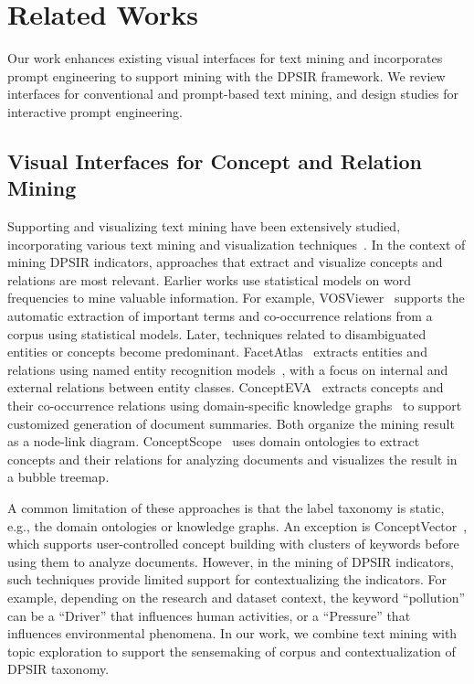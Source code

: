 \section{Related Works}
Our work enhances existing visual interfaces for text mining and incorporates prompt engineering to support mining with the DPSIR framework.
We review interfaces for conventional and prompt-based text mining, and design studies for interactive prompt engineering.

\vspace*{-0.15cm}
\subsection{Visual Interfaces for Concept and Relation Mining}
Supporting and visualizing text mining have been extensively studied, incorporating various text mining and visualization techniques~\cite{liu2019bridging}. 
In the context of mining DPSIR indicators, approaches that extract and visualize concepts and relations are most relevant.
Earlier works use statistical models on word frequencies to mine valuable information.
For example, VOSViewer~\cite{wong2018vosviewer} supports the automatic extraction of important terms and co-occurrence relations from a corpus using statistical models. 
Later, techniques related to disambiguated entities or concepts become predominant.
FacetAtlas~\cite{cao2010facetatlas} extracts entities and relations using named entity recognition models~\cite{finkel2005ner}, with a focus on internal and external relations between entity classes. 
ConceptEVA~\cite{zhang2023concepteva} extracts concepts and their co-occurrence relations using domain-specific knowledge graphs~\cite{mendes2011dbpediaspotlight} to support customized generation of document summaries.
Both organize the mining result as a node-link diagram.
ConceptScope~\cite{zhang2021conceptscope} uses domain ontologies to extract concepts and their relations for analyzing documents and visualizes the result in a bubble treemap.

A common limitation of these approaches is that the label taxonomy is static, e.g., the domain ontologies or knowledge graphs.
An exception is ConceptVector~\cite{park2018conceptvector}, which supports user-controlled concept building with clusters of keywords before using them to analyze documents.
However, in the mining of DPSIR indicators, such techniques provide limited support for contextualizing the indicators. 
For example, depending on the research and dataset context, the keyword ``pollution'' can be a ``Driver'' that influences human activities, or a ``Pressure'' that influences environmental phenomena. 
In our work, we combine text mining with topic exploration to support the sensemaking of corpus and contextualization of DPSIR taxonomy.

